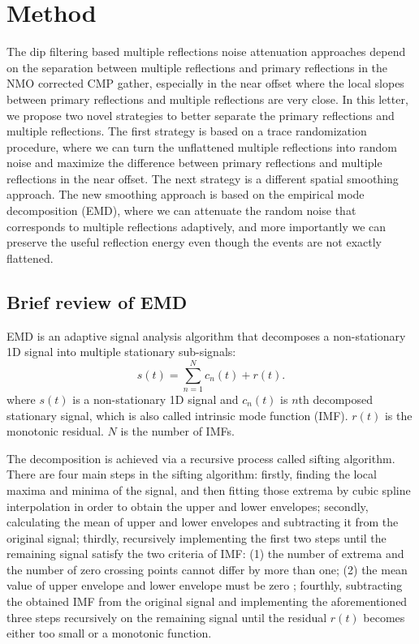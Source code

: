 \section{Method}
The dip filtering based multiple reflections noise attenuation approaches depend on the separation between multiple reflections and primary reflections in the NMO corrected CMP gather, especially in the near offset where the local slopes between primary reflections and multiple reflections are very close. In this letter, we propose two novel strategies to better separate the primary reflections and multiple reflections. The first strategy is based on a trace randomization procedure, where we can turn the unflattened multiple reflections into random noise and maximize the difference between primary reflections and multiple reflections in the near offset. The next strategy is a different spatial smoothing approach. The new smoothing approach is based on the empirical mode decomposition (EMD), where we can attenuate the random noise that corresponds to multiple reflections adaptively, and more importantly we can preserve the useful reflection energy even though the events are not exactly flattened. 

\subsection{Brief review of EMD}
EMD is an adaptive signal analysis algorithm that decomposes a non-stationary 1D signal into multiple stationary sub-signals:
\begin{equation}
\label{eq:emd}
s(t) = \sum_{n=1}^N c_n(t) + r(t).
\end{equation}
where $s(t)$ is a non-stationary 1D signal and $c_n(t)$ is $n$th decomposed stationary signal, which is also called intrinsic mode function (IMF). $r(t)$ is the monotonic residual. $N$ is the number of IMFs.

The decomposition is achieved via a recursive process called sifting algorithm. There are four main steps in the sifting algorithm: firstly, finding the local maxima and minima of the signal, and then fitting those extrema by cubic spline interpolation in order to obtain the upper and lower envelopes; secondly, calculating the mean of upper and lower envelopes and subtracting it from the original signal; thirdly, recursively implementing the first two steps until the remaining signal satisfy the two criteria of IMF: (1) the number of extrema and the number of zero crossing points cannot differ by more than one; (2) the mean value of upper envelope and lower envelope must be zero \cite{huangemd}; fourthly, subtracting the obtained IMF from the original signal and implementing the aforementioned three steps recursively on the remaining signal until the residual $r(t)$ becomes either too small or a monotonic function.

